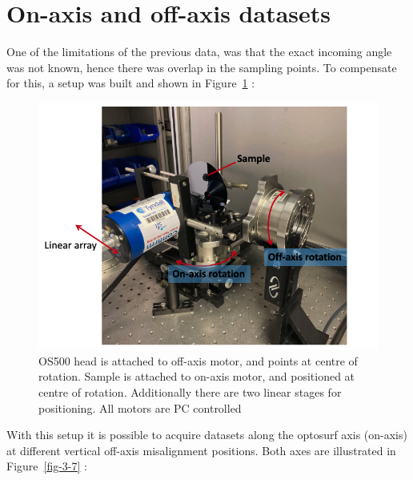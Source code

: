 \documentclass[
  letterpaper,
  DIV=11,
  numbers=noendperiod,
  oneside]{scrreprt}
\begin{document}
\hypertarget{on-axis-and-off-axis-datasets}{%
\section{On-axis and off-axis
datasets}\label{on-axis-and-off-axis-datasets}}

One of the limitations of the previous data, was that the exact incoming
angle was not known, hence there was overlap in the sampling points. To
compensate for this, a setup was built and shown in Figure~\ref{fig-3-6}
:

\begin{figure}

{\centering \includegraphics{notebooks/figures/b/fig_3_2_setup.png}

}

\caption{\label{fig-3-6}OS500 head is attached to off-axis motor, and
points at centre of rotation. Sample is attached to on-axis motor, and
positioned at centre of rotation. Additionally there are two linear
stages for positioning. All motors are PC controlled}

\end{figure}

With this setup it is possible to acquire datasets along the optosurf
axis (on-axis) at different vertical off-axis misalignment positions.
Both axes are illustrated in Figure~\ref{fig-3-7} :
\end{document}
